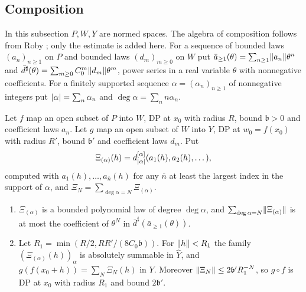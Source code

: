 \subsection{Composition}\label{amb:ssec:proofs-composition}

In this subsection $P,W,Y$ are normed spaces. The algebra of composition follows from Roby \cite[VI \S8, Prop.~VI.6 and its Cor.; Prop.~I.2; II \S1]{Ro}; only the estimate is added here. For a sequence of bounded laws $(a_n)_{n\ge1}$ on $P$ and bounded laws $(d_m)_{m\ge0}$ on $W$ put $\bar a_{\ge1}(\theta)=\sum_{n\ge1}\lVert a_n\rVert\theta^n$ and $\bar d^\sharp(\theta)=\sum_{m\ge0}C_0^m\lVert d_m\rVert\theta^m$, power series in a real variable $\theta$ with nonnegative coefficients. For a finitely supported sequence $\alpha=(\alpha_n)_{n\ge1}$ of nonnegative integers put $\lvert \alpha\rvert=\sum_n\alpha_n$ and $\deg\alpha=\sum_nn\alpha_n$.

\begin{lemma}\label{amb:lem:composition}
Let $f$ map an open subset of $P$ into $W$, DP at $x_0$ with radius $R$, bound $\mathfrak b>0$ and coefficient laws $a_n$. Let $g$ map an open subset of $W$ into $Y$, DP at $w_0=f(x_0)$ with radius $R'$, bound $\mathfrak b'$ and coefficient laws $d_m$. Put
\[
 \Xi_{(\alpha)}(h)=d_{\lvert \alpha\rvert}^{[\alpha]}(a_1(h),a_2(h),\dots),
\]
computed with $a_1(h),\dots,a_{\overline n}(h)$ for any $\overline n$ at least the largest index in the support of $\alpha$, and $\Xi_N=\sum_{\deg\alpha=N}\Xi_{(\alpha)}$.
\begin{enumerate}
\item $\Xi_{(\alpha)}$ is a bounded polynomial law of degree $\deg\alpha$, and $\sum_{\deg\alpha=N}\lVert \Xi_{(\alpha)}\rVert$ is at most the coefficient of $\theta^N$ in $\bar d^\sharp(\bar a_{\ge1}(\theta))$.
\item Let $R_1=\min(R/2,RR'/(8C_0\mathfrak b))$. For $\lVert h\rVert<R_1$ the family $(\Xi_{(\alpha)}(h))_\alpha$ is absolutely summable in $\widehat Y$, and $g(f(x_0+h))=\sum_N\Xi_N(h)$ in $Y$. Moreover $\lVert \Xi_N\rVert\le2\mathfrak b'R_1^{-N}$, so $g\circ f$ is DP at $x_0$ with radius $R_1$ and bound $2\mathfrak b'$.
\end{enumerate}
\end{lemma}

